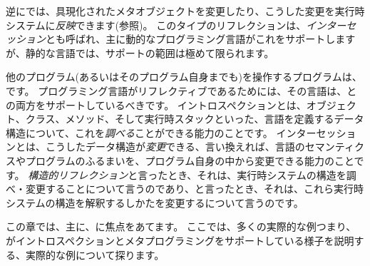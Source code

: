 \documentclass[a4paper,10pt,twoside]{book}
\begin{document}
逆に\st{}では、具現化されたメタオブジェクトを変更したり、こうした変更を実行時システムに\emph{反映}できます(参照)。
このタイプのリフレクションは、\emph{インターセッション}とも呼ばれ、主に動的なプログラミング言語がこれをサポートしますが、静的な言語では、サポートの範囲は極めて限られます。

他のプログラム(あるいはそのプログラム自身までも)を操作するプログラムは、です。
プログラミング言語がリフレクティブであるためには、その言語は、との両方をサポートしているべきです。
イントロスペクションとは、オブジェクト、クラス、メソッド、そして実行時スタックといった、言語を定義するデータ構造について、これを\emph{調べる}ことができる能力のことです。
インターセッションとは、こうしたデータ構造が\emph{変更}できる、言い換えれば、言語のセマンティクスやプログラムのふるまいを、プログラム自身の中から変更できる能力のことです。
\emph{構造的リフレクション}と言ったとき、それは、実行時システムの構造を調べ・変更することについて言うのであり、と言ったとき、それは、これら実行時システムの構造を解釈するしかたを変更するについて言うのです。

この章では、主に、に焦点をあてます。
ここでは、多くの実際的な例つまり、\st{}がイントロスペクションとメタプログラミングをサポートしている様子を説明する、実際的な例について探ります。
\end{document}
